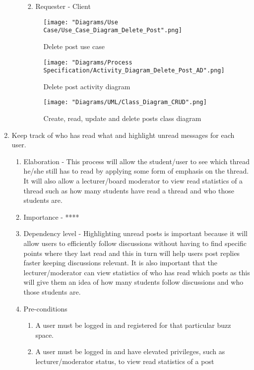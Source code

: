\documentclass[12pt]{article}
\begin{document}
\begin{enumerate}
\begin{enumerate}
\begin{enumerate}
\begin{enumerate}
   	 		\end{enumerate}
   	 		\item Requester - Client
  		\end{enumerate}
  	\begin{figure}[h]
  		\centering
  		\texttt{[image: "Diagrams/Use Case/Use\_Case\_Diagram\_Delete\_Post".png]}
  		\caption{Delete post use case}
  	\end{figure}
  	\begin{figure}[h]
  		\centering
  		\texttt{[image: "Diagrams/Process Specification/Activity\_Diagram\_Delete\_Post\_AD".png]}
  		\caption{Delete post activity diagram}
  	\end{figure}
  	\begin{figure}[h]
  		\centering
  		\texttt{[image: "Diagrams/UML/Class\_Diagram\_CRUD".png]}
  		\caption{Create, read, update and delete posts class diagram}
  	\end{figure}
  	\clearpage
  	\end{enumerate}
\clearpage %
  \item Keep track of who has read what and highlight unread messages for each user. %
  \begin{enumerate}
    \item Elaboration - This process will allow the student/user to see which thread he/she still has to read by applying some form of emphasis on the thread. It will also allow a lecturer/board moderator to view read statistics of a thread such as how many students have read a thread and who those students are.
    \item Importance - ****
    \item Dependency level - Highlighting unread posts is important because it will allow users to efficiently follow discussions without having to find specific points where they last read and this in turn will help users post replies faster keeping discussions relevant. It is also important that the lecturer/moderator can view statistics of who has read which posts as this will give them an idea of how many students follow discussions and who those students are.
    \item Pre-conditions
    \begin{enumerate}
    	\item A user must be logged in and registered for that particular buzz space.
    	\item A user must be logged in and have elevated privileges, such as lecturer/moderator status, to view read statistics of a post

\end{enumerate}
\end{enumerate}
\end{enumerate}
\end{document}
